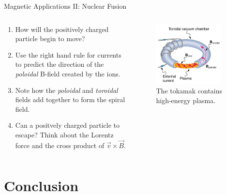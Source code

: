 \documentclass{beamer}
\begin{document}
\begin{frame}{Magnetic Applications II: Nuclear Fusion}
\small
\begin{columns}[T]
\begin{column}{0.5\textwidth}
\begin{enumerate}
\item How will the positively charged particle begin to move?
\item Use the right hand rule for currents to predict the direction of the \textit{poloidal} B-field created by the ions.
\item Note how the \textit{poloidal} and \textit{toroidal} fields add together to form the spiral field.
\item  Can a positvely charged particle to escape?  Think about the Lorentz force and the cross product of $\vec{v} \times \vec{B}$.
\end{enumerate}
\end{column}
\begin{column}{0.5\textwidth}
\begin{figure}
\centering
\includegraphics[width=0.9\textwidth]{figures/tokamak.png}
\caption{\label{fig:tokamak3} The tokamak contains high-energy plasma.}
\end{figure}
\end{column}
\end{columns}
\end{frame}

\section{Conclusion}
\end{document}
